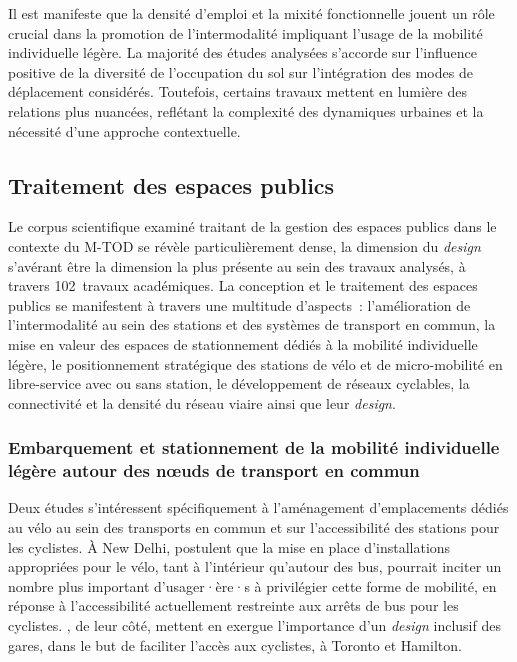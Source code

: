 \begin{refsegment}
Il est manifeste que la densité d'emploi et la mixité fonctionnelle jouent un rôle crucial dans la promotion de l'intermodalité impliquant l'usage de la mobilité individuelle légère. La majorité des études analysées s'accorde sur l'influence positive de la diversité de l'occupation du sol sur l'intégration des modes de déplacement considérés. Toutefois, certains travaux mettent en lumière des relations plus nuancées, reflétant la complexité des dynamiques urbaines et la nécessité d'une approche contextuelle.%
    
\subsection{Traitement des espaces publics
    \label{chap2:traitement-espaces-publics}
    }

Le corpus scientifique examiné traitant de la gestion des espaces publics dans le contexte du \acrshort{M-TOD} se révèle particulièrement dense, la dimension du \textsl{\gls{design}} s'avérant être la dimension la plus présente au sein des travaux analysés, à travers 102~travaux académiques. La conception et le traitement des espaces publics se manifestent à travers une multitude d'aspects~: l'amélioration de l'intermodalité au sein des stations et des systèmes de transport en commun, la mise en valeur des espaces de stationnement dédiés à la mobilité individuelle légère, le positionnement stratégique des stations de vélo et de micro-mobilité en libre-service avec ou sans station, le développement de réseaux cyclables, la connectivité et la densité du réseau viaire ainsi que leur \textsl{design}.%

\subsubsection*{Embarquement et stationnement de la mobilité individuelle légère autour des nœuds de transport en commun
    \label{chap2:embarquement-stationnement}
    }
    
Deux études s'intéressent spécifiquement à l'aménagement d'emplacements dédiés au vélo au sein des transports en commun et sur l'accessibilité des stations pour les cyclistes. À New Delhi, \textcolor{blue}{\textcite[8]{advani_bicycle_2006}} postulent que la mise en place d'installations appropriées pour le vélo, tant à l'intérieur qu'autour des bus, pourrait inciter un nombre plus important d'usager·ère·s à privilégier cette forme de mobilité, en réponse à l'accessibilité actuellement restreinte aux arrêts de bus pour les cyclistes. \textcolor{blue}{\textcite[382]{ravensbergen_biking_2018}}, de leur côté, mettent en exergue l'importance d'un \textsl{design} inclusif des gares, dans le but de faciliter l'accès aux cyclistes, à Toronto et Hamilton.%


\end{refsegment}
